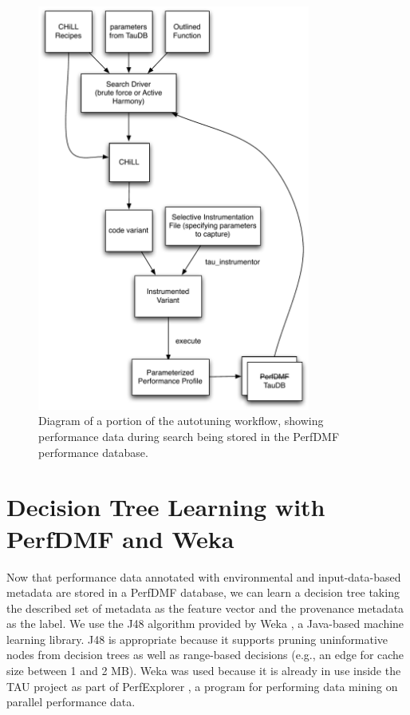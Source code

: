 \documentclass[msthesis,justified,copyright,final,numbers,sort&compress,
gsmodern,amstex,natbib]{uothesis}
\begin{document}
\begin{figure}[tbp]
\centering
\includegraphics[width=0.80\textwidth]{autotune.pdf}
\caption[Diagram of data being stored in PerfDMF]{Diagram of a portion of the autotuning workflow, showing performance data during search being stored in the PerfDMF performance database.}
\label{fig:autotune}
\end{figure}

\section{Decision Tree Learning with PerfDMF and Weka}
\label{treelearn}

Now that performance data annotated with environmental and input-data-based metadata are stored in a PerfDMF database, we can learn a decision tree taking the described set of metadata as the feature vector and the provenance metadata as the label. We use the J48 algorithm provided by Weka \cite{weka}, a Java-based machine learning library. J48 is appropriate because it supports pruning uninformative nodes from decision trees as well as range-based decisions (e.g., an edge for cache size between 1 and 2 MB). Weka was used because it is already in use inside the TAU project as part of PerfExplorer \cite{perfexplorer}, a program for performing data mining on parallel performance data.
\end{document}
